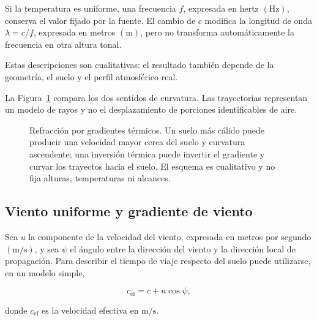 Si la temperatura es uniforme, una frecuencia \(f\), expresada en hertz
\((\text{Hz})\), conserva el valor fijado por la fuente. El cambio de \(c\)
modifica la longitud de onda \(\lambda=c/f\), expresada en metros
\((\text{m})\), pero no transforma automáticamente la frecuencia en otra
altura tonal.

Estas descripciones son cualitativas: el resultado también depende de la
geometría, el suelo y el perfil atmosférico real.

La Figura~\ref{fig:u9-gradientes-termicos} compara los dos sentidos de
curvatura. Las trayectorias representan un modelo de rayos y no el
desplazamiento de porciones identificables de aire.

\begin{figure}[htbp]
    \centering
    
    \caption{Refracción por gradientes térmicos. Un suelo más cálido puede
    producir una velocidad mayor cerca del suelo y curvatura ascendente; una
    inversión térmica puede invertir el gradiente y curvar los trayectos hacia
    el suelo. El esquema es cualitativo y no fija alturas, temperaturas ni
    alcances.}
    \label{fig:u9-gradientes-termicos}
\end{figure}

\subsection{Viento uniforme y gradiente de viento}
\label{sec:u9-viento}

Sea \(u\) la componente de la velocidad del viento, expresada en metros por
segundo \((\text{m}/\text{s})\), y sea \(\psi\) el ángulo entre la dirección
del viento y la dirección local de propagación. Para describir el tiempo de
viaje respecto del suelo puede utilizarse, en un modelo simple,

\begin{equation}
    c_\mathrm{ef}=c+u\cos\psi,
    \label{eq:u9-velocidad-efectiva-viento}
\end{equation}

donde \(c_\mathrm{ef}\) es la velocidad efectiva en
\(\text{m}/\text{s}\). 


